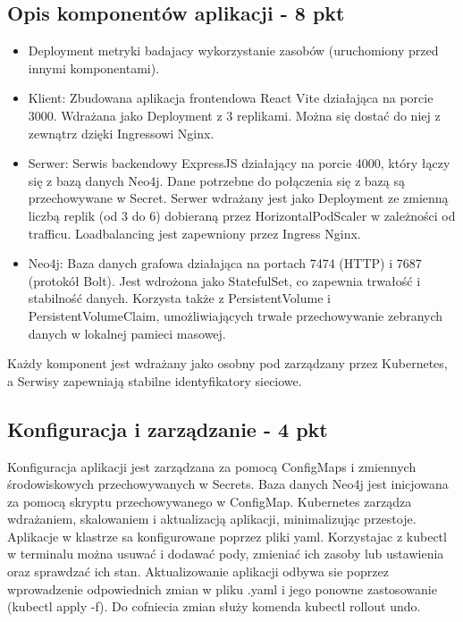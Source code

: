 \documentclass[12pt,a4paper]{article}
\begin{document}
\subsection{Opis komponentów aplikacji - 8 pkt}
\label{sec:FunctionalConditions}
\begin{itemize}
    \item Deployment metryki badajacy wykorzystanie zasobów (uruchomiony przed innymi komponentami).
    \item Klient: Zbudowana aplikacja frontendowa React Vite działająca na porcie 3000. Wdrażana jako Deployment z 3 replikami. Można się dostać do niej z zewnątrz dzięki Ingressowi Nginx.
    \item Serwer: Serwis backendowy ExpressJS działający na porcie 4000, który łączy się z bazą danych Neo4j. Dane potrzebne do połączenia się z bazą są przechowywane w Secret. Serwer wdrażany jest jako Deployment ze zmienną liczbą replik (od 3 do 6) dobieraną przez HorizontalPodScaler w zależności od trafficu. Loadbalancing jest zapewniony przez Ingress Nginx.
    \item Neo4j: Baza danych grafowa działająca na portach 7474 (HTTP) i 7687 (protokół Bolt). Jest wdrożona jako StatefulSet, co zapewnia trwałość i stabilność danych. Korzysta także z PersistentVolume i PersistentVolumeClaim, umożliwiających trwałe przechowywanie zebranych danych w lokalnej pamieci masowej.
\end{itemize}
Każdy komponent jest wdrażany jako osobny pod zarządzany przez Kubernetes, a Serwisy zapewniają stabilne identyfikatory sieciowe.

\subsection{Konfiguracja i zarządzanie - 4 pkt}
\label{sec:NonFunctionalConditions}
Konfiguracja aplikacji jest zarządzana za pomocą ConfigMaps i zmiennych \\środowiskowych przechowywanych w Secrets. Baza danych Neo4j jest inicjowana za pomocą skryptu przechowywanego w ConfigMap. Kubernetes zarządza wdrażaniem, skalowaniem i aktualizacją aplikacji, minimalizując przestoje. Aplikacje w klastrze sa konfigurowane poprzez pliki yaml. Korzystajac z kubectl w terminalu można usuwać i dodawać pody, zmieniać ich zasoby lub ustawienia oraz sprawdzać ich stan. Aktualizowanie aplikacji odbywa sie poprzez wprowadzenie odpowiednich zmian w pliku .yaml i jego ponowne zastosowanie (kubectl apply -f). Do cofniecia zmian służy komenda kubectl rollout undo.
\end{document}
